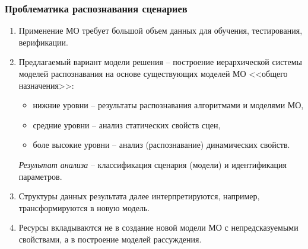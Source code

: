 \documentclass[handout]{beamer}
\begin{document}
\begin{frame}
  \frametitle{Проблематика распознавания сценариев}
  \begin{enumerate}
  \item Применение МО требует большой объем данных для обучения, тестирования, верификации.
  \item Предлагаемый вариант модели решения -- построение иерархической системы моделей распознавания на основе существующих моделей МО <<общего назначения>>:
    \begin{itemize}
    \item нижние уровни -- результаты распознавания алгоритмами и моделями МО,
    \item средние уровни -- анализ статических свойств сцен,
    \item боле высокие уровни -- анализ (распознавание) динамических свойств.
    \end{itemize}
    \emph{Результат анализа} -- классификация сценария (модели) и идентификация параметров.


  \item Структуры данных результата далее интерпретируются, например, трансформируются в новую модель.
  \item Ресурсы вкладываются не в создание новой модели МО с непредсказуемыми свойствами, а в построение моделей рассуждения.
    \end{enumerate}
\end{frame}
\end{document}
